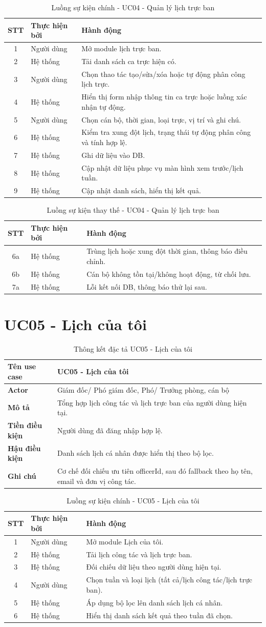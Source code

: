 \documentclass[18pt,a4paper]{report}
\newcommand{\specinfo}[6]{
\begin{table}[H]
\centering
\caption{Thông kết đặc tả #1}
\begin{tabularx}{\textwidth}{|>{\raggedright\arraybackslash}p{3.2cm}|X|}
\hline
\textbf{Tên use case} & #1 \\ \hline
\textbf{Actor} & #2 \\ \hline
\textbf{Mô tả} & #3 \\ \hline
\textbf{Tiền điều kiện} & #4 \\ \hline
\textbf{Hậu điều kiện} & #5 \\ \hline
\textbf{Ghi chú} & #6 \\ \hline
\end{tabularx}
\end{table}
}
\newcommand{\mainflowtable}[1]{
\begin{table}[H]
\centering
\caption{Luồng sự kiện chính - #1}
\begin{tabularx}{\textwidth}{|c|>{\raggedright\arraybackslash}p{3cm}|X|}
\hline
\textbf{STT} & \textbf{Thực hiện bởi} & \textbf{Hành động} \\ \hline
}
\newcommand{\altflowtable}[1]{
\begin{table}[H]
\centering
\caption{Luồng sự kiện thay thế - #1}
\begin{tabularx}{\textwidth}{|c|>{\raggedright\arraybackslash}p{3cm}|X|}
\hline
\textbf{STT} & \textbf{Thực hiện bởi} & \textbf{Hành động} \\ \hline
}
\begin{document}
\mainflowtable{UC04 - Quản lý lịch trực ban}
1 & Người dùng & Mở module lịch trực ban. \\ \hline
2 & Hệ thống & Tải danh sách ca trực hiện có. \\ \hline
3 & Người dùng & Chọn thao tác tạo/sửa/xóa hoặc tự động phân công lịch trực. \\ \hline
4 & Hệ thống & Hiển thị form nhập thông tin ca trực hoặc luồng xác nhận tự động. \\ \hline
5 & Người dùng & Chọn cán bộ, thời gian, loại trực, vị trí và ghi chú. \\ \hline
6 & Hệ thống & Kiểm tra xung đột lịch, trạng thái tự động phân công và tính hợp lệ. \\ \hline
7 & Hệ thống & Ghi dữ liệu vào DB. \\ \hline
8 & Hệ thống & Cập nhật dữ liệu phục vụ màn hình xem trước/lịch tuần. \\ \hline
9 & Hệ thống & Cập nhật danh sách, hiển thị kết quả. \\ \hline
\end{tabularx}
\end{table}

\altflowtable{UC04 - Quản lý lịch trực ban}
6a & Hệ thống & Trùng lịch hoặc xung đột thời gian, thông báo điều chỉnh. \\ \hline
6b & Hệ thống & Cán bộ không tồn tại/không hoạt động, từ chối lưu. \\ \hline
7a & Hệ thống & Lỗi kết nối DB, thông báo thử lại sau. \\ \hline
\end{tabularx}
\end{table}

\section{UC05 - Lịch của tôi}
\specinfo
{UC05 - Lịch của tôi}
{Giám đốc/ Phó giám đốc, Phó/ Trưởng phòng, cán bộ}
{Tổng hợp lịch công tác và lịch trực ban của người dùng hiện tại.}
{Người dùng đã đăng nhập hợp lệ.}
{Danh sách lịch cá nhân được hiển thị theo bộ lọc.}
{Cơ chế đối chiếu ưu tiên officerId, sau đó fallback theo họ tên, email và đơn vị công tác.}

\mainflowtable{UC05 - Lịch của tôi}
1 & Người dùng & Mở module Lịch của tôi. \\ \hline
2 & Hệ thống & Tải lịch công tác và lịch trực ban. \\ \hline
3 & Hệ thống & Đối chiếu dữ liệu theo người dùng hiện tại. \\ \hline
4 & Người dùng & Chọn tuần và loại lịch (tất cả/lịch công tác/lịch trực ban). \\ \hline
5 & Hệ thống & Áp dụng bộ lọc lên danh sách lịch cá nhân. \\ \hline
6 & Hệ thống & Hiển thị danh sách kết quả theo tuần đã chọn. \\ \hline
\end{tabularx}
\end{table}
\end{document}
